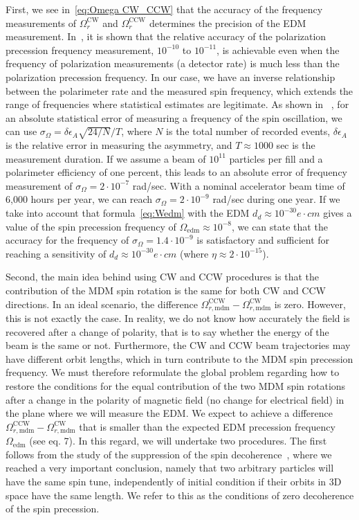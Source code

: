 \documentclass[a4paper]{jacow}
\begin{document}
First, we see in~\eqref{eq:Omega CW_CCW} that the accuracy of the frequency measurements
of $\Omega_{r}^{\mathrm{CW}}$ and $\Omega_{r}^{\mathrm{CCW}}$   determines the precision of the EDM measurement.
In~\cite{Eversmann}, it is shown that the relative accuracy of the polarization precession frequency
measurement, $10^{-10}$ to $10^{-11}$,   is achievable even when the frequency of polarization measurements (a detector rate) is much less than the polarization precession frequency. In our case, we have an inverse relationship between the polarimeter rate and the measured spin frequency, which extends the range of frequencies where statistical estimates are legitimate. As shown in ~\cite{Aksentyev}, for an absolute statistical error of measuring a frequency of the spin oscillation, we can use $\sigma_{\Omega}=\delta\epsilon_{A}\sqrt{24/N}/T$, where $N$  is the total number of recorded events, $\delta\epsilon_{A}$   is the relative error in measuring the asymmetry, and $T\approx 1000$  sec is the measurement duration. If we assume a beam of $10^{11}$  particles per fill and a polarimeter efficiency of one percent, this leads to an absolute error of frequency measurement of  $\sigma_{\Omega}=2\cdot10^{-7}$ rad/sec. With a nominal accelerator beam time of 6,000 hours per year, we can reach $\sigma_{\Omega}=2\cdot10^{-9}$ rad/sec during one year. If we take into account that formula~\eqref{eq:Wedm} with the EDM $d_d\approx 10^{-30} e\cdot cm$  gives a value of the spin precession frequency of $\Omega_{\mathrm{edm}}\approx 10^{-8}$, we can state that the accuracy for the frequency of $\sigma_{\Omega}=1.4\cdot10^{-9}$   is satisfactory and sufficient for reaching a sensitivity of $d_d\approx 10^{-30}e\cdot cm$ (where $\eta\approx2\cdot10^{-15}$).

Second, the main idea behind using CW and CCW procedures is that the contribution of the MDM spin rotation is the same for both CW and CCW directions. In an ideal scenario, the difference $\Omega_{r,\mathrm{mdm}}^{\mathrm{CCW}}-\Omega_{r,\mathrm{mdm}}^{\mathrm{CW}}$   is zero. However, this is not exactly the case. In reality, we do not know how accurately the field is recovered after a change of polarity, that is to say whether the energy of the beam is the same or not. Furthermore, the CW and CCW beam trajectories may  have different orbit lengths, which in turn contribute to the MDM spin precession frequency. We must therefore reformulate the global problem regarding how to restore the conditions for the equal contribution of the two MDM spin rotations after a change in the polarity of magnetic field (no change for electrical field) in the plane where we will measure the EDM. We expect to achieve a difference $\Omega_{r,\mathrm{mdm}}^{\mathrm{CCW}}-\Omega_{r,\mathrm{mdm}}^{\mathrm{CW}}$ that is smaller than the expected EDM precession frequency   $\Omega_{\mathrm{edm}}$ (see eq. 7). In this regard, we will undertake two procedures. The first follows from the study of the suppression of the spin decoherence~\cite{IPAC2013,decoherence}, where we reached a very important conclusion, namely that two arbitrary particles will have the same spin tune, independently of initial condition if their  orbits in 3D space have the same length. We refer to this as the conditions of zero decoherence of the spin precession.
\end{document}
